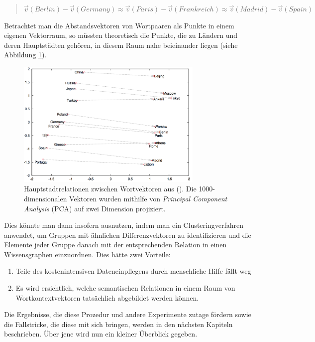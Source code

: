 \begin{quote}
  $\vec{v}(Berlin) - \vec{v}(Germany) \approx \vec{v}(Paris) - \vec{v}(Frankreich) \approx \vec{v}(Madrid) - \vec{v}(Spain)$
\end{quote}

Betrachtet man die Abstandsvektoren von Wortpaaren als Punkte in einem eigenen Vektorraum, so müssten theoretisch die Punkte,
die zu Ländern und deren Hauptstädten gehören, in diesem Raum nahe beieinander liegen (siehe Abbildung \ref{fig:capitals}).

\begin{figure}[h]
    \centering
    \includegraphics[width=0.8\textwidth]{../img/capitals.png}
    \caption[Hauptstadtrelationen zwischen Wortkontextvektoren]{Hauptstadtrelationen
    zwischen Wortvektoren aus (\cite{mikolov2013distributed}). Die 1000-dimensionalen Vektoren wurden mithilfe von
    \emph{Principal Component Analysis} (PCA) auf zwei Dimension projiziert.}\label{fig:capitals}
\end{figure}

Dies könnte man dann insofern ausnutzen, indem man ein Clusteringverfahren anwendet, um Gruppen mit ähnlichen
Differenzvektoren zu identifizieren und die Elemente jeder Gruppe danach mit der entsprechenden Relation in einen
Wissensgraphen einzuordnen. Dies hätte zwei Vorteile:
\begin{enumerate}
  \item Teile des kostenintensiven Dateneinpflegens durch menschliche Hilfe fällt weg
  \item Es wird ersichtlich, welche semantischen Relationen in einem Raum von Wortkontextvektoren tatsächlich abgebildet
  werden können.
\end{enumerate}

Die Ergebnisse, die diese Prozedur und andere Experimente zutage fördern sowie die Fallstricke, die diese mit sich
bringen, werden in den nächsten Kapiteln beschrieben. Über jene wird nun ein kleiner Überblick gegeben.

